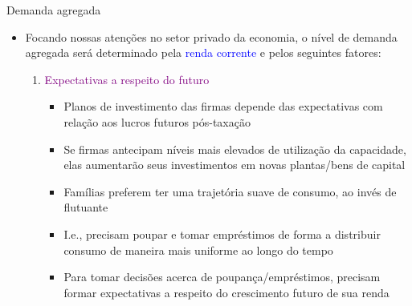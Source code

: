 \documentclass[10pt]{beamer}
\begin{document}
\begin{frame}{Demanda agregada}
    \begin{itemize}
        \item Focando nossas atenções no setor privado da economia, o nível de demanda agregada será determinado pela \textcolor{blue}{renda corrente} e pelos seguintes fatores:\bigskip
         
        \begin{enumerate}
            \item \textcolor{purple}{Expectativas a respeito do futuro}\medskip
            \begin{itemize}
                \item Planos de investimento das firmas depende das expectativas com relação aos lucros futuros pós-taxação\medskip
                 
                \item Se firmas antecipam níveis mais elevados de utilização da capacidade, elas aumentarão seus investimentos em novas plantas/bens de capital\medskip
                 
                \item Famílias preferem ter uma trajetória suave de consumo, ao invés de flutuante\medskip
                 
                \item I.e., precisam poupar e tomar empréstimos de forma a distribuir consumo de maneira mais uniforme ao longo do tempo\medskip
                 
                \item Para tomar decisões acerca de poupança/empréstimos, precisam formar expectativas a respeito do crescimento futuro de sua renda
            \end{itemize}                        
        \end{enumerate}
    \end{itemize}
\end{frame}
\end{document}
